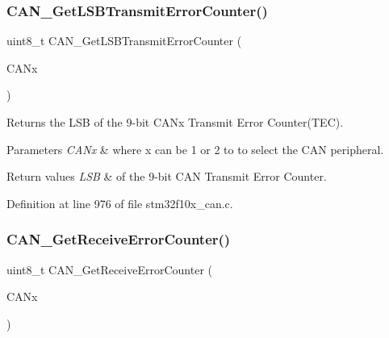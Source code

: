 \subsubsection{\texorpdfstring{C\+A\+N\+\_\+\+Get\+L\+S\+B\+Transmit\+Error\+Counter()}{CAN\_GetLSBTransmitErrorCounter()}}
{\footnotesize\ttfamily uint8\+\_\+t C\+A\+N\+\_\+\+Get\+L\+S\+B\+Transmit\+Error\+Counter (\begin{DoxyParamCaption}\item[{\hyperlink{struct_c_a_n___type_def}{C\+A\+N\+\_\+\+Type\+Def} $\ast$}]{C\+A\+Nx }\end{DoxyParamCaption})}



Returns the L\+SB of the 9-\/bit C\+A\+Nx Transmit Error Counter(\+T\+E\+C). 


\begin{DoxyParams}{Parameters}
{\em C\+A\+Nx} & where x can be 1 or 2 to to select the C\+AN peripheral. \\
\hline
\end{DoxyParams}

\begin{DoxyRetVals}{Return values}
{\em L\+SB} & of the 9-\/bit C\+AN Transmit Error Counter. \\
\hline
\end{DoxyRetVals}


Definition at line 976 of file stm32f10x\+\_\+can.\+c.

\mbox{\label{group___c_a_n___exported___functions_ga6903eecbec40eb1361d915ddde9a3274}} 
\subsubsection{\texorpdfstring{C\+A\+N\+\_\+\+Get\+Receive\+Error\+Counter()}{CAN\_GetReceiveErrorCounter()}}
{\footnotesize\ttfamily uint8\+\_\+t C\+A\+N\+\_\+\+Get\+Receive\+Error\+Counter (\begin{DoxyParamCaption}\item[{\hyperlink{struct_c_a_n___type_def}{C\+A\+N\+\_\+\+Type\+Def} $\ast$}]{C\+A\+Nx }\end{DoxyParamCaption})}



